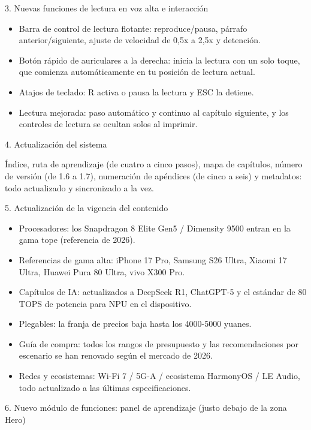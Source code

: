 3. Nuevas funciones de lectura en voz alta e interacción

\begin{itemize}
  \item Barra de control de lectura flotante: reproduce/pausa, párrafo anterior/siguiente, ajuste de velocidad de 0,5x a 2,5x y detención.
  \item Botón rápido de auriculares a la derecha: inicia la lectura con un solo toque, que comienza automáticamente en tu posición de lectura actual.
  \item Atajos de teclado: R activa o pausa la lectura y ESC la detiene.
  \item Lectura mejorada: paso automático y continuo al capítulo siguiente, y los controles de lectura se ocultan solos al imprimir.
\end{itemize}

4. Actualización del sistema

Índice, ruta de aprendizaje (de cuatro a cinco pasos), mapa de capítulos, número de versión (de 1.6 a 1.7), numeración de apéndices (de cinco a seis) y metadatos: todo actualizado y sincronizado a la vez.

5. Actualización de la vigencia del contenido

\begin{itemize}
  \item Procesadores: los Snapdragon 8 Elite Gen5 / Dimensity 9500 entran en la gama tope (referencia de 2026).
  \item Referencias de gama alta: iPhone 17 Pro, Samsung S26 Ultra, Xiaomi 17 Ultra, Huawei Pura 80 Ultra, vivo X300 Pro.
  \item Capítulos de IA: actualizados a DeepSeek R1, ChatGPT-5 y el estándar de 80 TOPS de potencia para NPU en el dispositivo.
  \item Plegables: la franja de precios baja hasta los 4000-5000 yuanes.
  \item Guía de compra: todos los rangos de presupuesto y las recomendaciones por escenario se han renovado según el mercado de 2026.
  \item Redes y ecosistemas: Wi-Fi 7 / 5G-A / ecosistema HarmonyOS / LE Audio, todo actualizado a las últimas especificaciones.
\end{itemize}

6. Nuevo módulo de funciones: panel de aprendizaje (justo debajo de la zona Hero)

